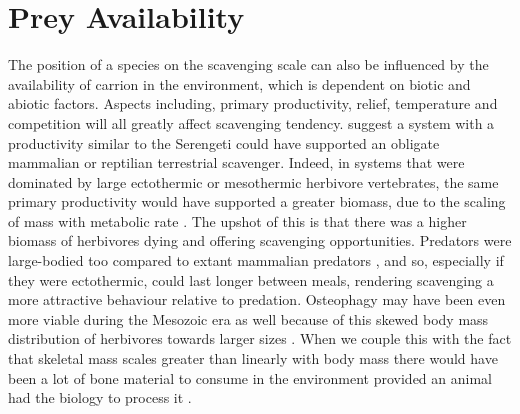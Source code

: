 \documentclass[a4paper,12pt]{article}
\begin{document}
\section*{Prey Availability}
The position of a species on the scavenging scale can also be influenced by the availability of carrion in the environment, which is dependent on biotic and abiotic factors.
Aspects including, primary productivity, relief, temperature and competition will all greatly affect scavenging tendency. 
\cite{ruxton2004obligate} suggest a system with a productivity similar to the Serengeti could have supported an obligate mammalian or reptilian terrestrial scavenger.
Indeed, in systems that were dominated by large ectothermic or mesothermic herbivore vertebrates, the same primary productivity would have supported a greater biomass, due to the scaling of mass with metabolic rate \citep{mcnab2009resources}.
The upshot of this is that there was a higher biomass of herbivores dying and offering scavenging opportunities.
Predators were large-bodied too compared to extant mammalian predators \citep{mcnab2009resources}, and so, especially if they were ectothermic, could last longer between meals, rendering scavenging a more attractive behaviour relative to predation.
Osteophagy may have been even more viable during the Mesozoic era as well because of this skewed body mass distribution of herbivores towards larger sizes \citep{10.1371/journal.pone.0051925}.
When we couple this with the fact that skeletal mass scales greater than linearly with body mass \citep{prange1979scaling} there would have been a lot of bone material to consume in the environment provided an animal had the biology to process it \citep{chure1997one}.
\end{document}
